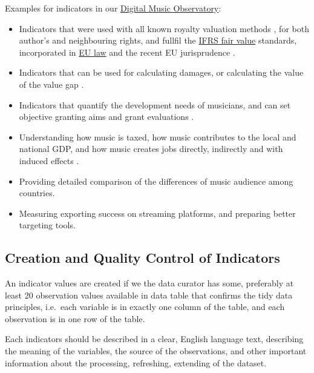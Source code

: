 \documentclass[
  a4paper,
  openany, a4paper, oneside]{book}
\begin{document}
Examples for indicators in our \href{https://music.dataobservatory.eu/}{Digital Music Observatory}:

\begin{itemize}
\item
  Indicators that were used with all known royalty valuation methods \citep{pwc_valuing_2008}, for both author's and neighbouring rights, and fullfil the \href{https://www.ifrs.org/issued-standards/list-of-standards/ifrs-13-fair-value-measurement/}{IFRS fair value} standards, incorporated in \href{https://eur-lex.europa.eu/legal-content/EN/TXT/HTML/?uri=CELEX:32012R1255\&from=EN\%7D}{EU law} and the recent EU jurisprudence \citep{cjeu_osa_2014, cjeu_akka_2017}.
\item
  Indicators that can be used for calculating damages, or calculating the value of the value gap \citep{antal_pcr_croatia_2019, antal_szabad_2019_en}.
\item
  Indicators that quantify the development needs of musicians, and can set objective granting aims and grant evaluations \citep{antal_javaslatok_2015}.
\item
  Understanding how music is taxed, how music contributes to the local and national GDP, and how music creates jobs directly, indirectly and with induced effects \citep{antal_slovenskom_hudobnom_2019}.
\item
  Providing detailed comparison of the differences of music audience among countries.
\item
  Measuring exporting success on streaming platforms, and preparing better targeting tools.
\end{itemize}

\hypertarget{authoring-indicator}{%
\subsection{Creation and Quality Control of Indicators}\label{authoring-indicator}}

An indicator values are created if we the data curator has some, preferably at least 20 observation values available in data table that confirms the tidy data principles, i.e.~each variable is in exactly one column of the table, and each observation is in one row of the table.

Each indicators should be described in a clear, English language text, describing the meaning of the variables, the source of the observations, and other important information about the processing, refreshing, extending of the dataset.
\end{document}
